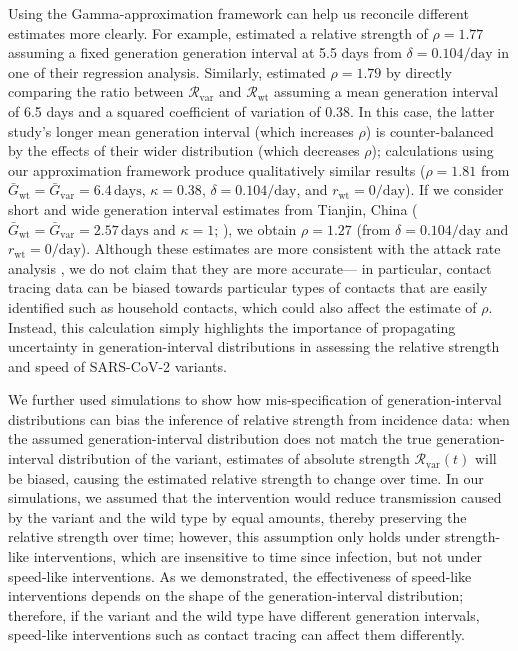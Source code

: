\documentclass[12pt]{article}
\newcommand{\vvvar}{\mathrm{var}}
\newcommand{\wwwt}{\mathrm{wt}}
\newcommand{\rx}[1]{\ensuremath{{r}_{#1}}\xspace}
\newcommand{\rw}{\rx{\wwwt}}
\newcommand{\Rx}[1]{\ensuremath{{\mathcal R}_{#1}}\xspace}
\newcommand{\Rw}{\Rx{\wwwt}}
\newcommand{\Rv}{\Rx{\vvvar}}
\newcommand{\days}{\ensuremath{\, \textrm{days}}}
\newcommand{\pday}{\ensuremath{/\textrm{day}}}
\newcommand{\Gx}[1]{\ensuremath{{\bar G}_{#1}}\xspace}
\newcommand{\Gw}{\Gx{\wwwt}}
\newcommand{\Gv}{\Gx{\vvvar}}
\begin{document}
Using the Gamma-approximation framework \citep{doi:10.1098/rsif.2020.0144} can help us reconcile different estimates more clearly.
For example, \cite{davies2021estimated} estimated a relative strength of $\rho=1.77$ assuming a fixed generation generation interval at 5.5 days from $\delta=0.104\pday$ in one of their regression analysis.
Similarly, \cite{volz2021transmission} estimated $\rho=1.79$ by directly comparing the ratio between $\Rv$ and $\Rw$ assuming a mean generation interval of 6.5 days and a squared coefficient of variation of 0.38.
In this case, the latter study's longer mean generation interval (which increases $\rho$) is counter-balanced by the effects of their wider distribution (which decreases $\rho$); calculations using our approximation framework produce qualitatively similar results ($\rho=1.81$ from $\Gw=\Gv=6.4\days$, $\kappa=0.38$, $\delta=0.104\pday$, and $\rw=0\pday$).
If we consider short and wide generation interval estimates from Tianjin, China ($\Gw=\Gv=2.57\days$ and $\kappa=1$; \cite{ganyani2020estimating}), we obtain $\rho=1.27$ (from $\delta=0.104\pday$ and $\rw = 0\pday$).
Although these estimates are more consistent with the attack rate analysis \citep{ukinvest},
we do not claim that they are more accurate---
in particular, contact tracing data can be biased towards particular types of contacts that are easily identified such as household contacts, which could also affect the estimate of $\rho$.
Instead, this calculation simply highlights the importance of propagating uncertainty in generation-interval distributions in assessing the relative strength and speed of SARS-CoV-2 variants.

We further used simulations to show how mis-specification of generation-interval distributions can bias the inference of relative strength from incidence data:
when the assumed generation-interval distribution does not match the true generation-interval distribution of the variant, estimates of absolute strength $\Rv(t)$ will be biased, causing the estimated relative strength to change over time.
In our simulations, we assumed that the intervention would reduce transmission caused by the variant and the wild type by equal amounts, thereby preserving the relative strength over time;
however, this assumption only holds under strength-like interventions, which are insensitive to time since infection, but not under speed-like interventions. 
As we demonstrated, the effectiveness of speed-like interventions depends on the shape of the generation-interval distribution;
therefore, if the variant and the wild type have different generation intervals, speed-like interventions such as contact tracing can affect them differently.
\end{document}
